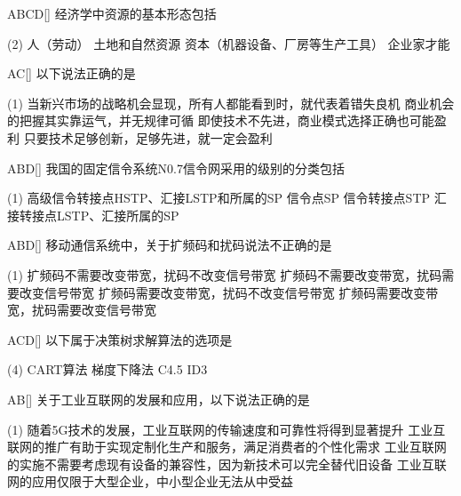 \begin{choice}{\;ABCD\;}[]
    经济学中资源的基本形态包括
    \begin{tasks}(2)
        \task 人（劳动）
        \task 土地和自然资源
        \task 资本（机器设备、厂房等生产工具）
        \task 企业家才能
    \end{tasks}
\end{choice}

\begin{choice}{\;AC\;}[]
    以下说法正确的是
    \begin{tasks}(1)
        \task 当新兴市场的战略机会显现，所有人都能看到时，就代表着错失良机
        \task 商业机会的把握其实靠运气，并无规律可循
        \task 即使技术不先进，商业模式选择正确也可能盈利
        \task 只要技术足够创新，足够先进，就一定会盈利
    \end{tasks}
\end{choice}

\begin{choice}{\;ABD\;}[]
    我国的固定信令系统N0.7信令网采用的级别的分类包括
    \begin{tasks}(1)
        \task 高级信令转接点HSTP、汇接LSTP和所属的SP
        \task 信令点SP
        \task 信令转接点STP
        \task 汇接转接点LSTP、汇接所属的SP
    \end{tasks}
\end{choice}

\begin{choice}{\;ABD\;}[]
    移动通信系统中，关于扩频码和扰码说法不正确的是
    \begin{tasks}(1)
        \task 扩频码不需要改变带宽，扰码不改变信号带宽
        \task 扩频码不需要改变带宽，扰码需要改变信号带宽
        \task 扩频码需要改变带宽，扰码不改变信号带宽
        \task 扩频码需要改变带宽，扰码需要改变信号带宽
    \end{tasks}
\end{choice}

\begin{choice}{\;ACD\;}[]
    以下属于决策树求解算法的选项是
    \begin{tasks}(4)
        \task CART算法
        \task 梯度下降法
        \task C4.5
        \task ID3
    \end{tasks}
\end{choice}

\begin{choice}{\;AB\;}[]
    关于工业互联网的发展和应用，以下说法正确的是
    \begin{tasks}(1)
        \task 随着5G技术的发展，工业互联网的传输速度和可靠性将得到显著提升
        \task 工业互联网的推广有助于实现定制化生产和服务，满足消费者的个性化需求
        \task 工业互联网的实施不需要考虑现有设备的兼容性，因为新技术可以完全替代旧设备
        \task 工业互联网的应用仅限于大型企业，中小型企业无法从中受益
    \end{tasks}
\end{choice}

